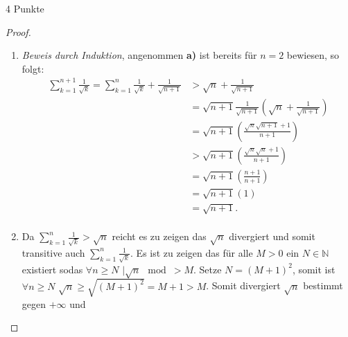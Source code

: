 \documentclass{problemset}
\begin{document}
\begin{problem}{4 Punkte}
\begin{proof}
    \begin{enumerate}
        \item \textit{Beweis durch Induktion}, angenommen \textbf{a)} ist bereits für $n=2$ bewiesen, so folgt: \begin{align*}
                  \sum_{k=1}^{n+1} \frac{1}{\sqrt{k}} = \sum_{k=1}^{n} \frac{1}{\sqrt{k}} + \frac{1}{\sqrt{n + 1}} & > \sqrt{n} + \frac{1}{\sqrt{n + 1}}                                              \\
                                                                                                                   & = \sqrt{n+1} \frac{1}{\sqrt{n+1}} \left(\sqrt{n} + \frac{1}{\sqrt{n + 1}}\right) \\
                                                                                                                   & = \sqrt{n+1} \left(\frac{\sqrt{n}\sqrt{n+1} + 1}{n + 1}\right)                   \\
                                                                                                                   & > \sqrt{n+1} \left(\frac{\sqrt{n}\sqrt{n} + 1}{n + 1}\right)                     \\
                                                                                                                   & = \sqrt{n+1} \left(\frac{n + 1}{n + 1}\right)                                    \\
                                                                                                                   & = \sqrt{n+1} (1)                                                                 \\
                                                                                                                   & = \sqrt{n+1} \tag*{\checkmark}.                                                  \\
              \end{align*}
        \item Da $\sum_{k=1}^{n} \frac{1}{\sqrt{k}} > \sqrt{n}$ reicht es zu
              zeigen das $\sqrt{n}$ divergiert und somit transitive auch
              $\sum_{k=1}^{n} \frac{1}{\sqrt{k}}$. Es ist zu zeigen das für
              alle $M > 0$ ein $N \in \mathbb{N}$ existiert sodas $\forall n
              \ge N$ $\mid \sqrt{n} \mod > M$. Setze $N = {(M + 1)}^2$, somit
              ist $\forall n \ge N$ $\sqrt{n} \ge \sqrt{{(M + 1)}^2} = M+1 >
              M$. Somit divergiert $\sqrt{n}$ bestimmt gegen $+\infty$ und

\end{enumerate}
\end{proof}
\end{problem}
\end{document}
